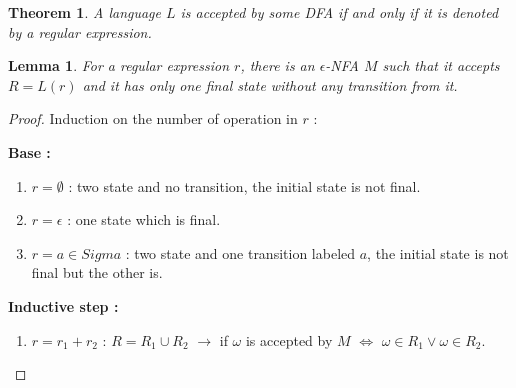 \documentclass[a4paper,11pt]{article}
\newtheorem{thm}{Theorem}[section]
\newtheorem{lemma}{Lemma}[section]
\begin{document}
\begin{thm}
  A language $L$ is accepted by some DFA if and only if it is denoted by a
  regular expression.
\end{thm}

\begin{lemma}
  For a regular expression $r$, there is an $\epsilon$-NFA $M$ such that it
  accepts $R = L(r)$ and it has only one final state without any transition from it.
\end{lemma}

\begin{proof}
  Induction on the number of operation in $r$ :
  
  \textbf{Base : }
  \begin{enumerate}
  \item $r = \emptyset$ : two state and no transition, the initial state is not final.
  \item $r = \epsilon$ : one state which is final.
  \item $r = a \in Sigma$ : two state and one transition labeled $a$, the
    initial state is not final but the other is.
  \end{enumerate}

  \textbf{Inductive step : }
  \begin{enumerate}
  \item $r = r_1 + r_2$ : $R = R_1 \cup R_2$ $\to$ if $\omega$ is accepted by $M$ $\iff$ $\omega \in R_1
    \vee \omega \in R_2$.
    
    \begin{center}
    \end{center}


\end{enumerate}
\end{proof}
\end{document}

